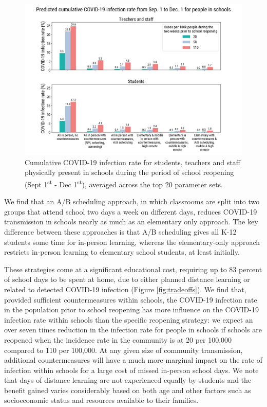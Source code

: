 \documentclass[preprint,12pt]{elsarticle}
\begin{document}
\begin{figure}[h]
    \centering
    \includegraphics[scale=0.4]{attack_rate_2020-08-06.png}
    \caption{Cumulative COVID-19 infection rate for students, teachers and staff physically present in schools during the period of school reopening (Sept 1\textsuperscript{st} - Dec 1\textsuperscript{st}), averaged across the top 20 parameter sets.}
    \label{fig:attack_rate}
\end{figure}

We find that an A/B scheduling approach, in which classrooms are split into two groups that attend school two days a week on different days, reduces COVID-19 transmission in schools nearly as much as an elementary only approach. The key difference between these approaches is that A/B scheduling gives all K-12 students some time for in-person learning, whereas the elementary-only approach restricts in-person learning to elementary school students, at least initially.

These strategies come at a significant educational cost, requiring up to 83 percent of school days to be spent at home, due to either planned distance learning or related to detected COVID-19 infection (Figure \ref{fig:tradeoffs}). We find that, provided sufficient countermeasures within schools, the COVID-19 infection rate in the population prior to school reopening has more influence on the COVID-19 infection rate within schools than the specific reopening strategy: we expect an over seven times reduction in the infection rate for people in schools if schools are reopened when the incidence rate in the community is at 20 per 100,000 compared to 110 per 100,000. At any given size of community transmission, additional countermeasures will have a much more marginal impact on the rate of infection within schools for a large cost of missed in-person school days. We note that days of distance learning are not experienced equally by students and the benefit gained varies considerably based on both age and other factors such as socioeconomic status and resources available to their families.
\end{document}
